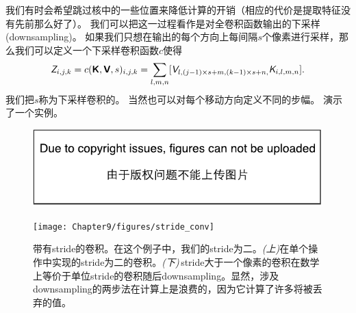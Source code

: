 我们有时会希望跳过核中的一些位置来降低计算的开销（相应的代价是提取特征没有先前那么好了）。
我们可以把这一过程看作是对全卷积函数输出的下采样(downsampling)。
如果我们只想在输出的每个方向上每间隔$s$个像素进行采样，那么我们可以定义一个下采样卷积函数$c$使得
\begin{equation}
\textit{\textsf{Z}}_{i,j,k} = c(\textsf{\textbf{K}}, \textsf{\textbf{V}}, s)_{i,j,k} = \sum_{l,m,n} [\textit{\textsf{V}}_{l,(j-1)\times s+m, (k-1)\times s +n,}
 \textit{\textsf{K}}_{i,l,m,n}].
 \label{eq:9.8}
\end{equation}
我们把$s$称为下采样卷积的。
当然也可以对每个移动方向定义不同的步幅。
演示了一个实例。
\begin{figure}[!htb]
\ifOpenSource
\centerline{\includegraphics{figure.pdf}}
\else
\centerline{\texttt{[image: Chapter9/figures/stride\_conv]}}
\fi
\caption{带有\gls{stride}的卷积。在这个例子中，我们的\gls{stride}为二。\emph{(上)}在单个操作中实现的\gls{stride}为二的卷积。\emph{(下)}\,\gls{stride}大于一个像素的卷积在数学上等价于单位\gls{stride}的卷积随后\gls{downsampling}。显然，涉及\gls{downsampling}的两步法在计算上是浪费的，因为它计算了许多将被丢弃的值。}
\label{fig:chap9_stride_conv}
\end{figure}

